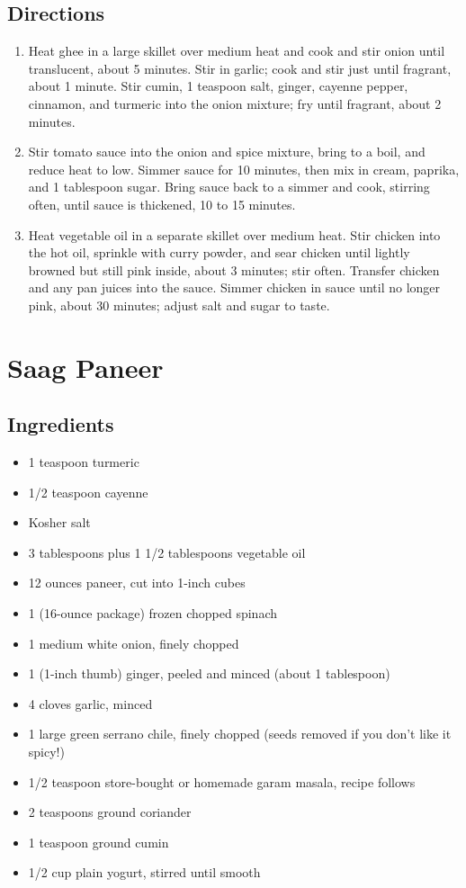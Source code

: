 \documentclass[oneside,11pt]{book}
\newcommand{\Ingredients}[1]{
	\subsection*{Ingredients}
	\begin{itemize} 
	  #1 
	\end{itemize}
}
\newcommand{\Directions}[1]{
	\subsection*{Directions}
	\begin{enumerate} 
	  #1 
	\end{enumerate}
}
\newcommand{\recipe}[1]{
	\section*{ \hspace{-12pt} #1 }
	\addcontentsline{toc}{section}{ \hspace{-6pt} #1 }
}
\begin{document}
		\Directions{
			\item Heat ghee in a large skillet over medium heat and cook and stir onion until translucent, about 5 minutes. 
                Stir in garlic; cook and stir just until fragrant, about 1 minute. 
                Stir cumin, 1 teaspoon salt, ginger, cayenne pepper, cinnamon, and turmeric into the onion mixture; 
                fry until fragrant, about 2 minutes.
			\item Stir tomato sauce into the onion and spice mixture, bring to a boil, and reduce heat to low.
				Simmer sauce for 10 minutes, then mix in cream, paprika, and 1 tablespoon sugar. 
				Bring sauce back to a simmer and cook, stirring often, until sauce is thickened, 10 to 15 minutes.
			\item Heat vegetable oil in a separate skillet over medium heat. 
                Stir chicken into the hot oil, sprinkle with curry powder, and sear chicken until lightly browned but still pink inside, about 3 minutes; stir often. 
                Transfer chicken and any pan juices into the sauce. 
                Simmer chicken in sauce until no longer pink, about 30 minutes; adjust salt and sugar to taste.
		}
		
	\recipe{Saag Paneer}
        \Ingredients{
            \item 1 teaspoon turmeric
            \item 1/2 teaspoon cayenne
            \item Kosher salt
            \item 3 tablespoons plus 1 1/2 tablespoons vegetable oil
            \item 12 ounces paneer, cut into 1-inch cubes
            \item 1 (16-ounce package) frozen chopped spinach
            \item 1 medium white onion, finely chopped
            \item 1 (1-inch thumb) ginger, peeled and minced (about 1 tablespoon)
            \item 4 cloves garlic, minced
            \item 1 large green serrano chile, finely chopped (seeds removed if you don't like it spicy!)
            \item 1/2 teaspoon store-bought or homemade garam masala, recipe follows
            \item 2 teaspoons ground coriander
            \item 1 teaspoon ground cumin
            \item 1/2 cup plain yogurt, stirred until smooth
        }
	  
\end{document}
